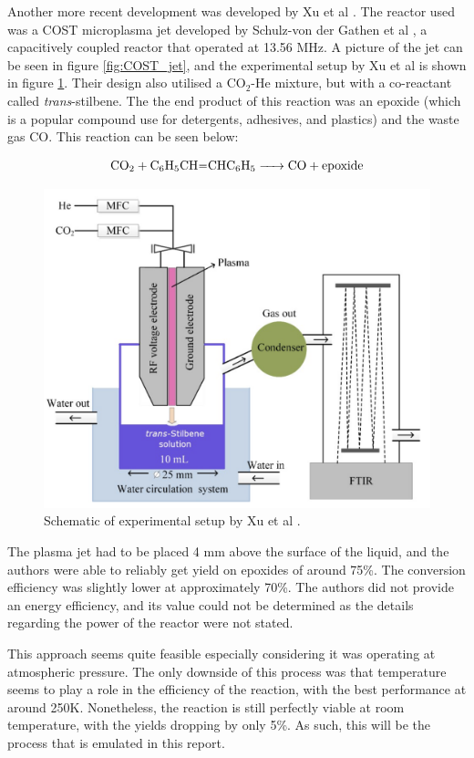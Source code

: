 Another more recent development was developed by  Xu et al \cite{Xu2021}. The reactor used was a COST microplasma jet developed by Schulz-von der Gathen et al \cite{VonDerGathen2008}, a capacitively coupled reactor that operated at 13.56 MHz. A picture of the jet can be seen in figure \ref{fig:COST_jet}, and the experimental setup by Xu et al is shown in figure \ref{fig:han_epoxidation_setup}. Their design also utilised a CO$_2$-He mixture, but with a co-reactant called \textit{trans}-stilbene. The the end product of this reaction was an epoxide (which is a popular compound use for detergents, adhesives, and plastics) and the waste gas CO. This reaction can be seen below:

\begin{equation}
    \ce{CO$_2$ + C_6H_5CH=CHC_6H_5 -> CO + epoxide}
\end{equation} 

\begin{figure}[h!]
	\centering
	\includegraphics[width=0.75\linewidth]{chapter_3/figures/han_epoxidation_setup.png}
	\caption{Schematic of experimental setup by Xu et al \cite{Xu2021}.}
	\label{fig:han_epoxidation_setup}
\end{figure}


The plasma jet had to be placed 4 mm above the surface of the liquid, and the authors were able to reliably get yield on epoxides of around 75\%. The conversion efficiency was slightly lower at approximately 70\%. The authors did not provide an energy efficiency, and its value could not be determined as the details regarding the power of the reactor were not stated. 

This approach seems quite feasible especially considering it was operating at atmospheric pressure. The only downside of this process was that temperature seems to play a role in the efficiency of the reaction, with the best performance at around 250K. Nonetheless, the reaction is still perfectly viable at room temperature, with the yields dropping by only 5\%. As such, this will be the process that is emulated in this report.



